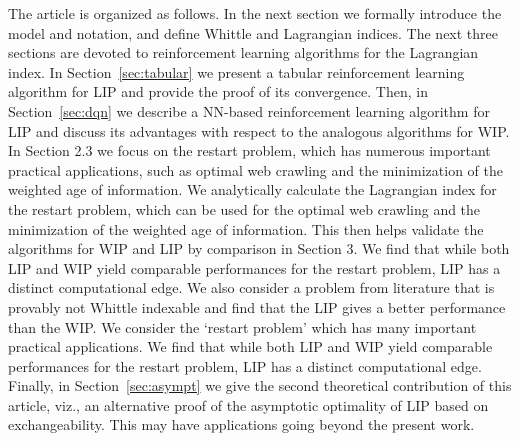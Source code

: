 \documentclass[12pt]{article}
\numberwithin{equation}{section}
\newcommand{\1}{\textbf{1}}
\begin{document}
The article is organized as follows. In the next section we formally introduce the model and notation, and define Whittle and Lagrangian indices. The next three sections are devoted to reinforcement learning algorithms for the Lagrangian index. 
In Section~\ref{sec:tabular} we present a tabular reinforcement learning algorithm for LIP and provide the proof of its convergence.
Then, in Section~\ref{sec:dqn} we describe a NN-based reinforcement learning algorithm for LIP and discuss its advantages with
respect to the analogous algorithms for WIP. 
In Section 2.3 we focus on the restart problem, which has numerous important practical applications, such as optimal web crawling and the minimization of the weighted age of information. We analytically calculate the Lagrangian index for the restart problem, which can be used for the optimal web crawling and the minimization of the weighted age of information. This then helps validate the algorithms for WIP and LIP by comparison in Section 3. We find that while both LIP and WIP yield comparable performances for the restart problem, LIP has a distinct computational edge.
We also consider a problem from literature that is provably not Whittle indexable and find that the LIP gives a better performance than the WIP. We consider the `restart problem' which has many important  practical applications. We find that while both LIP and WIP yield comparable performances for the restart problem, LIP has a distinct computational edge. Finally, 
in Section~\ref{sec:asympt} we give the second theoretical contribution of this article, viz., an alternative proof of the asymptotic optimality of LIP based on exchangeability. This may have applications going beyond the present work. 

\end{document}
